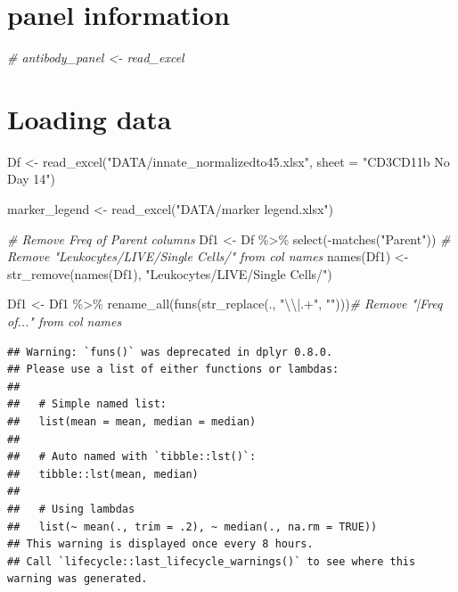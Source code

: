\documentclass[
]{book}
\newenvironment{Shaded}{\begin{snugshade}}{\end{snugshade}}
\newcommand{\AttributeTok}[1]{\textcolor[rgb]{0.77,0.63,0.00}{#1}}
\newcommand{\CommentTok}[1]{\textcolor[rgb]{0.56,0.35,0.01}{\textit{#1}}}
\newcommand{\FunctionTok}[1]{\textcolor[rgb]{0.00,0.00,0.00}{#1}}
\newcommand{\NormalTok}[1]{#1}
\newcommand{\OtherTok}[1]{\textcolor[rgb]{0.56,0.35,0.01}{#1}}
\newcommand{\SpecialCharTok}[1]{\textcolor[rgb]{0.00,0.00,0.00}{#1}}
\newcommand{\StringTok}[1]{\textcolor[rgb]{0.31,0.60,0.02}{#1}}
\begin{document}
\hypertarget{panel-information}{%
\section{panel information}\label{panel-information}}

\begin{Shaded}
\begin{Highlighting}[]
\CommentTok{\# antibody\_panel \textless{}{-} read\_excel}
\end{Highlighting}
\end{Shaded}

\hypertarget{loading-data}{%
\section{Loading data}\label{loading-data}}

\begin{Shaded}
\begin{Highlighting}[]
\NormalTok{Df }\OtherTok{\textless{}{-}} \FunctionTok{read\_excel}\NormalTok{(}\StringTok{"DATA/innate\_normalizedto45.xlsx"}\NormalTok{, }\AttributeTok{sheet =} \StringTok{"CD3CD11b No Day 14"}\NormalTok{)}

\NormalTok{marker\_legend }\OtherTok{\textless{}{-}} \FunctionTok{read\_excel}\NormalTok{(}\StringTok{"DATA/marker legend.xlsx"}\NormalTok{)}

\CommentTok{\# Remove Freq of Parent columns}
\NormalTok{Df1 }\OtherTok{\textless{}{-}}\NormalTok{ Df }\SpecialCharTok{\%\textgreater{}\%} 
  \FunctionTok{select}\NormalTok{(}\SpecialCharTok{{-}}\FunctionTok{matches}\NormalTok{(}\StringTok{"Parent"}\NormalTok{))}
\CommentTok{\# Remove "Leukocytes/LIVE/Single Cells/" from col names}
\FunctionTok{names}\NormalTok{(Df1) }\OtherTok{\textless{}{-}} \FunctionTok{str\_remove}\NormalTok{(}\FunctionTok{names}\NormalTok{(Df1), }\StringTok{"Leukocytes/LIVE/Single Cells/"}\NormalTok{)}

\NormalTok{Df1 }\OtherTok{\textless{}{-}}\NormalTok{ Df1 }\SpecialCharTok{\%\textgreater{}\%}
  \FunctionTok{rename\_all}\NormalTok{(}\FunctionTok{funs}\NormalTok{(}\FunctionTok{str\_replace}\NormalTok{(., }\StringTok{"}\SpecialCharTok{\textbackslash{}\textbackslash{}}\StringTok{|.+"}\NormalTok{, }\StringTok{""}\NormalTok{)))}\CommentTok{\# Remove "|Freq of..." from col names}
\end{Highlighting}
\end{Shaded}

\begin{verbatim}
## Warning: `funs()` was deprecated in dplyr 0.8.0.
## Please use a list of either functions or lambdas: 
## 
##   # Simple named list: 
##   list(mean = mean, median = median)
## 
##   # Auto named with `tibble::lst()`: 
##   tibble::lst(mean, median)
## 
##   # Using lambdas
##   list(~ mean(., trim = .2), ~ median(., na.rm = TRUE))
## This warning is displayed once every 8 hours.
## Call `lifecycle::last_lifecycle_warnings()` to see where this warning was generated.
\end{verbatim}
\end{document}
